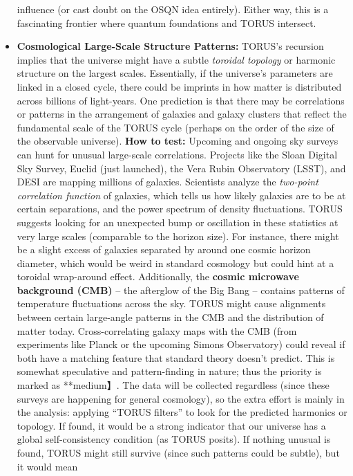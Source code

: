 \begin{itemize}
  influence (or cast doubt on the OSQN idea entirely). Either way, this
  is a fascinating frontier where quantum foundations and TORUS
  intersect.
\item
  \textbf{Cosmological Large-Scale Structure Patterns:} TORUS's
  recursion implies that the universe might have a subtle \emph{toroidal
  topology} or harmonic structure on the largest scales. Essentially, if
  the universe's parameters are linked in a closed cycle, there could be
  imprints in how matter is distributed across billions of light-years.
  One prediction is that there may be correlations or patterns in the
  arrangement of galaxies and galaxy clusters that reflect the
  fundamental scale of the TORUS cycle (perhaps on the order of the size
  of the observable universe). \textbf{How to test:} Upcoming and
  ongoing sky surveys can hunt for unusual large-scale correlations.
  Projects like the Sloan Digital Sky Survey, Euclid (just launched),
  the Vera Rubin Observatory (LSST), and DESI are mapping millions of
  galaxies. Scientists analyze the \emph{two-point correlation function}
  of galaxies, which tells us how likely galaxies are to be at certain
  separations, and the power spectrum of density fluctuations. TORUS
  suggests looking for an unexpected bump or oscillation in these
  statistics at very large scales (comparable to the horizon size)​. For
  instance, there might be a slight excess of galaxies separated by
  around one cosmic horizon diameter, which would be weird in standard
  cosmology but could hint at a toroidal wrap-around effect.
  Additionally, the \textbf{cosmic microwave background (CMB)} -- the
  afterglow of the Big Bang -- contains patterns of temperature
  fluctuations across the sky. TORUS might cause alignments between
  certain large-angle patterns in the CMB and the distribution of matter
  today​. Cross-correlating galaxy maps with the CMB (from experiments
  like Planck or the upcoming Simons Observatory) could reveal if both
  have a matching feature that standard theory doesn't predict​. This is
  somewhat speculative and pattern-finding in nature; thus the priority
  is marked as **medium】. The data will be collected regardless (since
  these surveys are happening for general cosmology), so the extra
  effort is mainly in the analysis: applying ``TORUS filters'' to look
  for the predicted harmonics or topology. If found, it would be a
  strong indicator that our universe has a global self-consistency
  condition (as TORUS posits). If nothing unusual is found, TORUS might
  still survive (since such patterns could be subtle), but it would mean

\end{itemize}
